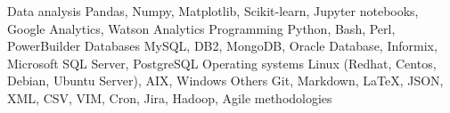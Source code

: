 %
%
%

    \begin{keywords}
        \keywordsentry
            {Data analysis}
            {
                Pandas,
                Numpy,
                Matplotlib,
                Scikit-learn,
                Jupyter notebooks,
                Google Analytics,
                Watson Analytics
            }
        \keywordsentry
            {Programming}
            {
                Python,
                Bash,
                Perl,
                PowerBuilder
            }
        \keywordsentry
            {Databases}
            {
                MySQL,
                DB2,
                MongoDB,
                Oracle Database, 
                Informix,
                Microsoft SQL Server,
                PostgreSQL
            }
        \keywordsentry
            {Operating systems}
            {
                Linux (Redhat, Centos, Debian, Ubuntu Server),
                AIX,
                Windows
            }
        \keywordsentry
            {Others}
            {
                Git,
                Markdown,
                \LaTeX,
                JSON,
                XML,
                CSV,
                VIM,
                Cron,
                Jira,
                Hadoop,
                Agile methodologies
            }
    \end{keywords}
